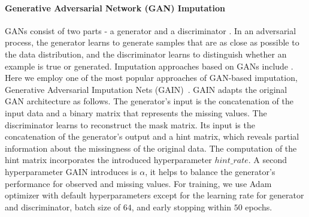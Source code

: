 \paragraph{Generative Adversarial Network (GAN) Imputation}
%
GANs consist of two parts - a generator and a discriminator \citep{GAN}. In an adversarial process, the generator learns to generate samples that are as close as possible to the data distribution, and the discriminator learns to distinguish whether an example is true or generated. Imputation approaches based on GANs include \cite{GAIN, VIGAN, MisGAN}.
Here we employ one of the most popular approaches of GAN-based imputation, Generative Adversarial Imputation Nets (GAIN)~\citep{GAIN}.
GAIN adapts the original GAN architecture as follows.
The generator's input is the concatenation of the input data and a binary matrix that represents the missing values. The discriminator learns to reconstruct the mask matrix. Its input is the concatenation of the generator's output and a hint matrix, which reveals partial information about the missingness of the original data. The computation of the hint matrix incorporates the introduced hyperparameter $hint\_rate$. A second hyperparameter GAIN introduces is $\alpha$, it helps to balance the generator's performance for observed and missing values.
For training, we use Adam optimizer with default hyperparameters except for the learning rate for generator and discriminator, batch size of $64$, and early stopping within $50$ epochs.



